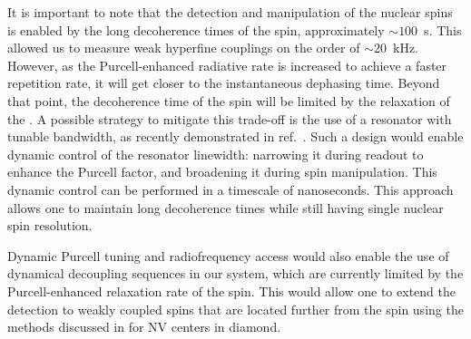 It is important to note that the detection and manipulation of the nuclear spins is enabled by the long decoherence times of the \Er spin, approximately $\sim 100$~\textmu s. This allowed us to measure weak hyperfine couplings on the order of $\sim 20$~kHz. However, as the Purcell-enhanced radiative rate is increased to achieve a faster repetition rate, it will get closer to the instantaneous dephasing time. Beyond that point, the decoherence time of the spin will be limited by the relaxation of the \Er. A possible strategy to mitigate this trade-off is the use of a resonator with tunable bandwidth, as recently demonstrated in ref.~. Such a design would enable dynamic control of the resonator linewidth: narrowing it during readout to enhance the Purcell factor, and broadening it during spin manipulation. This dynamic control can be performed in a timescale of nanoseconds. This approach allows one to maintain long decoherence times while still having single nuclear spin resolution.

Dynamic Purcell tuning and radiofrequency access would also enable the use of dynamical decoupling sequences in our system, which are currently limited by the Purcell-enhanced relaxation rate of the \Er spin. This would allow one to extend the detection to weakly coupled spins that are located further from the \Er spin using the methods discussed in  for NV centers in diamond.